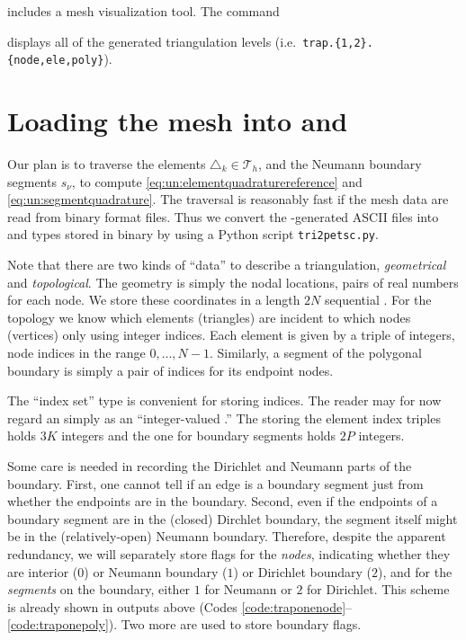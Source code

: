 \Triangle includes a mesh visualization tool.  The command
displays all of the generated triangulation levels (i.e.~\texttt{trap.\{1,2\}.\{node,ele,poly\}}).


\section{Loading the mesh into \PETSc \pVecs and \pISs}

Our plan is to traverse the elements $\triangle_k \in {}_h$, and the Neumann boundary segments $s_\nu$, to compute \eqref{eq:un:elementquadraturereference} and \eqref{eq:un:segmentquadrature}.  The traversal is reasonably fast if the mesh data are read from \PETSc binary format files.  Thus we convert the \Triangle-generated ASCII files into \pVec and \pIS types stored in binary by using a Python script \texttt{tri2petsc.py}.

Note that there are two kinds of ``data'' to describe a triangulation, \emph{geometrical} and \emph{topological}.  The geometry is simply the nodal locations, pairs of real numbers for each node.  We store these coordinates in a length $2N$ sequential \pVec.  For the topology we know which elements (triangles) are incident to which nodes (vertices) only using integer indices.  Each element is given by a triple of integers, node indices in the range $0,\dots,N-1$.  Similarly, a segment of the polygonal boundary is simply a pair of indices for its endpoint nodes.

The \PETSc \pIS ``index set'' type is convenient for storing indices.  The reader may for now regard an \pIS simply as an ``integer-valued \pVec.''  The \pIS storing the element index triples holds $3K$ integers and the one for boundary segments holds $2P$ integers.

Some care is needed in recording the Dirichlet and Neumann parts of the boundary.  First, one cannot tell if an edge is a boundary segment just from whether the endpoints are in the boundary.  Second, even if the endpoints of a boundary segment are in the (closed) Dirchlet boundary, the segment itself might be in the (relatively-open) Neumann boundary.  Therefore, despite the apparent redundancy, we will separately store flags for the \emph{nodes}, indicating whether they are interior ($0$) or Neumann boundary ($1$) or Dirichlet boundary ($2$), and for the \emph{segments} on the boundary, either $1$ for Neumann or $2$ for Dirichlet.  This scheme is already shown in \Triangle outputs above (Codes \ref{code:traponenode}--\ref{code:traponepoly}).  Two more \pISs are used to store boundary flags.

